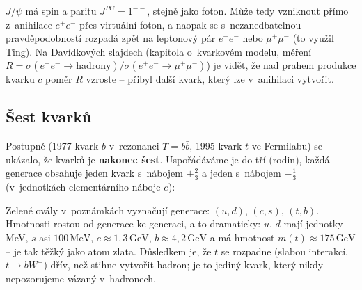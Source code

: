 \begin{vysvetleni}
  $J/\psi$ má spin a paritu $J^{PC}=1^{--}$, stejně jako foton. Může tedy vzniknout přímo z~anihilace $e^+e^-$ přes virtuální foton, a naopak se s~nezanedbatelnou pravděpodobností rozpadá zpět na leptonový pár $e^+e^-$ nebo $\mu^+\mu^-$ (to využil Ting). Na Davídkových slajdech (kapitola o~kvarkovém modelu, měření $R=\sigma(e^+e^-\to\text{hadrony})/\sigma(e^+e^-\to\mu^+\mu^-)$) je vidět, že nad prahem produkce kvarku $c$ poměr $R$ vzroste -- přibyl další kvark, který lze v~anihilaci vytvořit.
\end{vysvetleni}

\subsection{Šest kvarků}

Postupně (1977 kvark $b$ v~rezonanci $\Upsilon=b\bar b$, 1995 kvark $t$ ve Fermilabu) se ukázalo, že kvarků je \textbf{nakonec šest}. Uspořádáváme je do tří  (rodin), každá generace obsahuje jeden kvark s~nábojem $+\tfrac23$ a jeden s~nábojem $-\tfrac13$ (v~jednotkách elementárního náboje $e$):
\begin{center}
\end{center}
 Zelené ovály v~poznámkách vyznačují generace: $(u,d)$, $(c,s)$, $(t,b)$. Hmotnosti rostou od generace ke generaci, a to dramaticky: $u$, $d$ mají jednotky MeV, $s$ asi $100\,\mathrm{MeV}$, $c\approx1{,}3\,\mathrm{GeV}$, $b\approx4{,}2\,\mathrm{GeV}$ a  má hmotnost $m(t)\approx 175\,\mathrm{GeV}$ -- je tak těžký jako atom zlata. Důsledkem je, že $t$ se rozpadne (slabou interakcí, $t\to bW^+$) dřív, než stihne vytvořit hadron; je to jediný kvark, který nikdy nepozorujeme vázaný v~hadronech.


